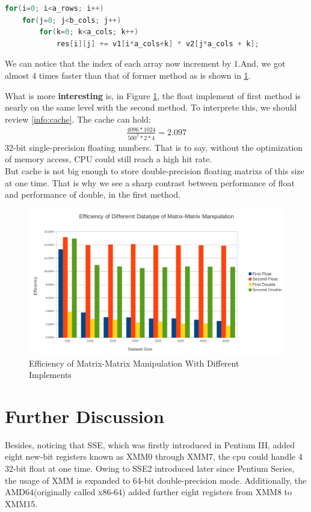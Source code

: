 \documentclass[a4paper]{article}   %
\begin{document}
\begin{CJK}{UTF8}{gbsn}
\begin{spacing}{1.2}
\begin{lstlisting}[language=C]
for(i=0; i<a_rows; i++)
	for(j=0; j<b_cols; j++)
		for(k=0; k<a_cols; k++)
			res[i][j] += v1[i*a_cols+k] * v2[j*a_cols + k];	
\end{lstlisting}

We can notice that the index of each array now increment by 1.And, we got almost 4 times faster than that of former method as is shown in \ref{figs:eff_mm}.

What is more \textbf{interesting} is, in Figure \ref{figs:eff_mm}, the float implement of first method is nearly on the same level with the second method. To interprete this, we should review \ref{info:cache}. The cache can hold:
\begin{align}
\frac{4096*1024}{500^2 * 2 * 4} = 2.097
\end{align}
32-bit single-precision floating numbers. That is to say, without the optimization of memory access, CPU could still reach a high hit rate. \\

But cache is not big enough to store double-precision floating matrixs of this size at one time. That is why we see a sharp contrast between performance of float and performance of double, in the first method. 

\begin{figure}[htbp]
\centering
\includegraphics[width=12cm]{figs/eff_mm.png}
\caption{Efficiency of Matrix-Matrix Manipulation With Different Implements}
\label{figs:eff_mm}
\end{figure}

\section{Further Discussion}
Besides, noticing that SSE, which was firstly introduced in Pentium III, added eight new-bit registers known as XMM0 through XMM7, the cpu could handle 4 32-bit float at one time. Owing to SSE2 introduced later since Pentium Series, the usage of XMM is expanded to 64-bit double-precision mode. Additionally, the AMD64(originally called x86-64) added further eight registers from XMM8 to XMM15.


\end{spacing}
\end{CJK}
\end{document}
